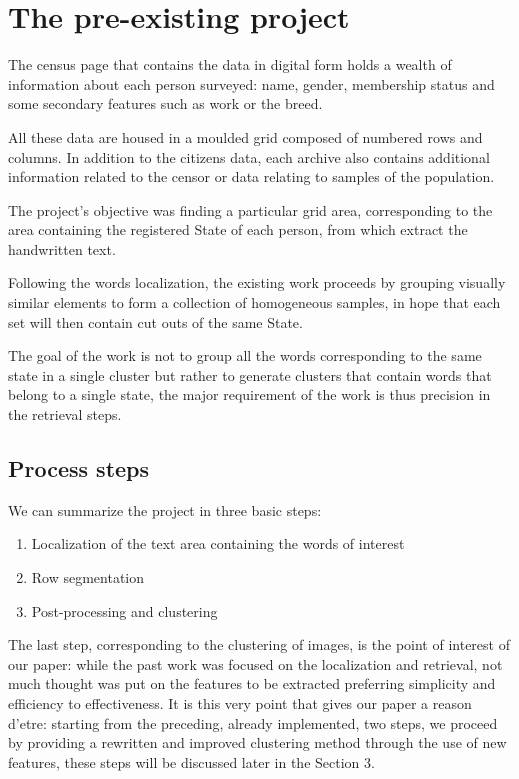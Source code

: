 \section{The pre-existing project}

The census page that contains the data in digital form holds a wealth of information about each person surveyed: name, gender, membership status and some secondary features such as work or the breed. 

All these data are housed in a moulded grid composed of numbered rows and columns. In addition to the citizens data, each archive also contains additional information related to the censor or data relating to samples of the population.

The project's objective was finding a particular grid area, corresponding to the area containing the registered State of each person, from which extract the handwritten text.

Following the words localization, the existing work proceeds by grouping visually similar elements to form a collection of homogeneous samples, in hope that each set will then contain cut outs of the same State.

The goal of the work is not to group all the words corresponding to the same state in a single cluster but rather to generate clusters that contain words that belong to a single state, the major requirement of the work is thus precision in the retrieval steps.

\subsection{Process steps}

We can summarize the project in three basic steps:
\begin{enumerate}
\item Localization of the text area containing the words of interest
\item Row segmentation
\item Post-processing and clustering
\end{enumerate}

The last step, corresponding to the clustering of images, is the point of interest of our paper: while the past work was focused on the localization and retrieval, not much thought was put on the features to be extracted preferring simplicity and efficiency to effectiveness.
It is this very point that gives our paper a reason d'etre: starting from the preceding, already implemented, two steps, we proceed by providing a rewritten and improved clustering method through the use of new features, these steps will be discussed later in the Section 3.

